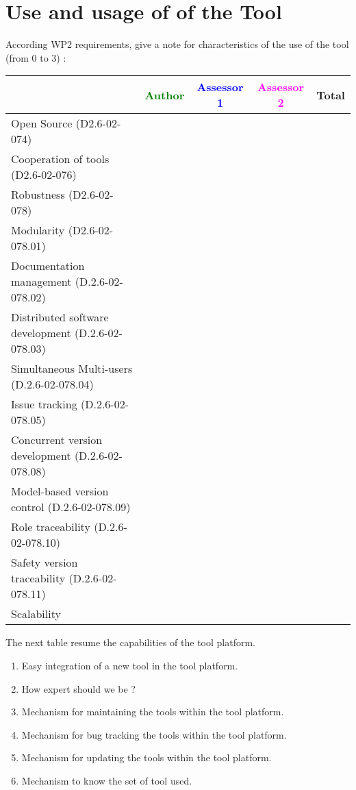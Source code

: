 \section{Use and usage of  of the Tool}
According WP2 requirements, give a note for characteristics of the use of the tool (from 0 to 3) :

\begin{tabular}{|l | c | c | c | c|}
\hline
& \textcolor{green}{Author} & \textcolor{blue}{Assessor 1} & \textcolor{magenta}{Assessor 2} & Total \\
\hline 
Open Source (D2.6-02-074) & & & &  \\
\hline 
Cooperation of tools (D2.6-02-076) & & & &  \\
\hline
Robustness (D2.6-02-078) & & & & \\
\hline
Modularity (D2.6-02-078.01) & & & & \\
\hline
Documentation management (D.2.6-02-078.02) & & & & \\
\hline
Distributed software development (D.2.6-02-078.03)  & & & & \\
\hline
Simultaneous Multi-users (D.2.6-02-078.04)   & & & & \\
\hline
Issue tracking (D.2.6-02-078.05) & & & & \\
\hline
Concurrent version development (D.2.6-02-078.08) & & & & \\
\hline
Model-based version control (D.2.6-02-078.09) & & & & \\
\hline
Role traceability (D.2.6-02-078.10) & & & & \\
\hline
Safety version traceability (D.2.6-02-078.11) & & & & \\
\hline
Scalability & & & & \\
\hline
\end{tabular}

The next table resume the capabilities of the tool platform.
\begin{enumerate}
\item Easy integration of a new tool in the tool platform.
\item How expert should we be ?
\item Mechanism for maintaining the tools within the tool platform.
\item Mechanism for bug tracking the tools within the tool platform.
\item Mechanism for updating the tools within the tool platform.
\item Mechanism to know the set of tool used.
\end{enumerate}

